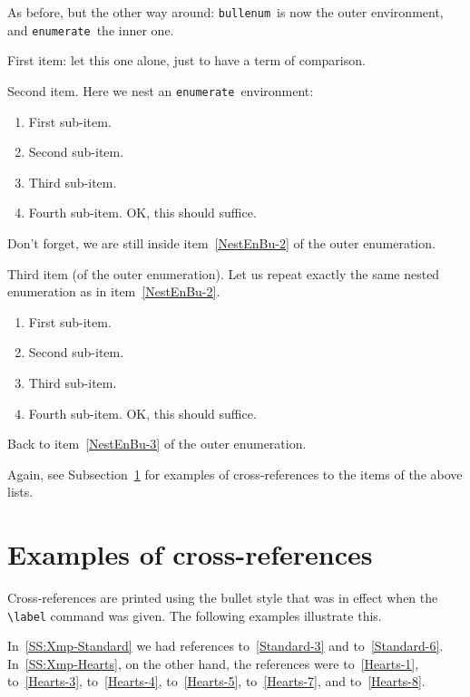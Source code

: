 \documentclass[a4paper]{article}
\DeclareRobustCommand*{\env}[1]{\texttt{#1}}
\newcommand*{\Bullenum}{bullenum}
\newcommand*{\Enumerat}{enumerate}
\newcommand*{\beenv}{\env{\Bullenum}}
\newcommand*{\enenv}{\env{\Enumerat}}
\begin{document}
As before, but the other way around: \beenv\ is now the outer
environment, and \enenv\ the inner one.

\begin{bullenum}
	\item
		First item: let this one alone, just to have a term of
		comparison.

	\item\label{NestEnBu-2}
		Second item.  Here we nest an \enenv\ environment:
		\begin{enumerate}
			\item\label{NestEnBu-2.1}
				First sub-item.
			\item\label{NestEnBu-2.2}
				Second sub-item.
			\item\label{NestEnBu-2.3}
				Third sub-item.
			\item\label{NestEnBu-2.4}
				Fourth sub-item.  OK, this should suffice.
		\end{enumerate}
		Don't forget, we are still inside item~\ref{NestEnBu-2} of
		the outer enumeration.

	\item\label{NestEnBu-3}
		Third item (of the outer enumeration).  Let us repeat exactly
		the same nested enumeration as in item~\ref{NestEnBu-2}.
		\begin{enumerate}
			\item\label{NestEnBu-3.1}
				First sub-item.
			\item\label{NestEnBu-3.2}
				Second sub-item.
			\item\label{NestEnBu-3.3}
				Third sub-item.
			\item\label{NestEnBu-3.4}
				Fourth sub-item.  OK, this should suffice.
		\end{enumerate}
		Back to item~\ref{NestEnBu-3} of the outer enumeration.
\end{bullenum}

Again, see Subsection~\ref{S:CrossXmp} for examples of
cross-references to the items of the above lists.



\section{Examples of cross-references}
\label{S:CrossXmp}

Cross-references are printed using the bullet style that was in effect
when the \verb|\label| command was given.  The following examples
illustrate this.

In~\ref{SS:Xmp-Standard} we had references to~\ref{Standard-3} and
to~\ref{Standard-6}.  In~\ref{SS:Xmp-Hearts}, on the other hand, the
references were to~\ref{Hearts-1}, to~\ref{Hearts-3},
to~\ref{Hearts-4}, to~\ref{Hearts-5}, to~\ref{Hearts-7}, and
to~\ref{Hearts-8}.
\end{document}
